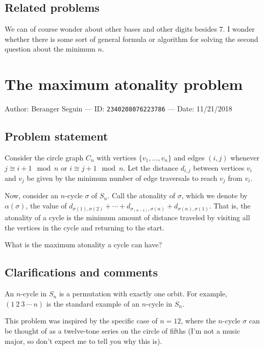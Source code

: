 \documentclass[10pt]{article}
\begin{document}
\subsection{Related problems}

We can of course wonder about other bases and other digits besides 7. I wonder whether there is some sort of general formula or algorithm for solving the second question about the minimum $n$.

\pagebreak

\section{The maximum atonality problem}

Author: Beranger Seguin --- ID: \verb`2340208076223786` --- Date: 11/21/2018

\subsection{Problem statement}

Consider the circle graph $C_n$ with vertices $\{v_1,\ldots,v_n\}$ and edges $(i,j)$ whenever $j\cong i+1\mod n$ or $i\cong j+1\mod n$. Let the distance $d_{i,j}$ between vertices $v_i$ and $v_j$ be given by the minimum number of edge traversals to reach $v_j$ from $v_i$.

Now, consider an $n$-cycle $\sigma$ of $S_n$. Call the atonality of $\sigma$, which we denote by $\alpha(\sigma)$, the value of $d_{\sigma(1),\sigma(2)}+\cdots+d_{\sigma_(n-1),\sigma(n)}+d_{\sigma(n),\sigma(1)}$. That is, the atonality of a cycle is the minimum amount of distance traveled by visiting all the vertices in the cycle and returning to the start.

What is the maximum atonality a cycle can have?

\subsection{Clarifications and comments}

An $n$-cycle in $S_n$ is a permutation with exactly one orbit. For example, $(1\ 2\ 3\  \cdots\ n)$ is the standard example of an $n$-cycle in $S_n$.

This problem was inspired by the specific case of $n=12$, where the $n$-cycle $\sigma$ can be thought of as a twelve-tone series on the circle of fifths (I'm not a music major, so don't expect me to tell you why this is).
\end{document}
